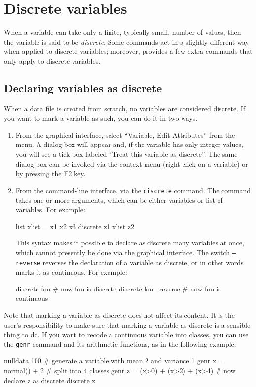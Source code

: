 \chapter{Discrete variables}
\label{chap:discrete}

When a variable can take only a finite, typically small, number of
values, then the variable is said to be \emph{discrete}. Some
 commands act in a slightly different way when applied to
discrete variables; moreover,  provides a few extra
commands that only apply to discrete variables.


\section{Declaring variables as discrete}
\label{discr-declare}

When a data file is created from scratch, no variables are considered
discrete. If you want to mark a variable as such, you can do it in two
ways.
\begin{enumerate}
\item From the graphical interface, select ``Variable, Edit
  Attributes'' from the menu. A dialog box will appear and, if the variable
  has only integer values, you will see a tick box labeled ``Treat this
  variable as discrete''.
  The same dialog box can be invoked via the context menu (right-click on
  a variable) or by pressing the F2 key.
\item From the command-line interface, via the \texttt{discrete}
  command. The command takes one or more arguments, which can be
  either variables or list of variables. For example:
\begin{code}
  list xlist = x1 x2 x3
  discrete z1 xlist z2
\end{code}
This syntax makes it possible to declare as discrete many
variables at once, which cannot presently be done via the graphical
interface. The switch \texttt{--reverse} reverses the declaration of a
variable as discrete, or in other words marks it as continuous.
For example:
\begin{code}
  discrete foo
  # now foo is discrete
  discrete foo --reverse
  # now foo is continuous
\end{code}
\end{enumerate}

Note that marking a variable as discrete does not affect its
content. It is the user's responsibility to make sure that marking a
variable as discrete is a sensible thing to do. If you want to recode
a continuous variable into classes, you can use the \texttt{genr}
command and its arithmetic functions, as in the following example:
\begin{code}
  nulldata 100
  # generate a variable with mean 2 and variance 1
  genr x = normal() + 2
  # split into 4 classes
  genr z = (x>0) + (x>2) + (x>4)
  # now declare z as discrete
  discrete z
\end{code}

